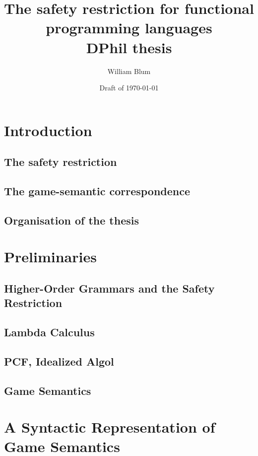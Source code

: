 


\author{William Blum}
\title{The safety restriction for functional programming languages\\{\small DPhil thesis}}
\date{Draft of \today}


\maketitle \tableofcontents


\chapter{Introduction}
    \section{The safety restriction}
    \section{The game-semantic correspondence}
    \section{Organisation of the thesis}

\chapter{Preliminaries}
    \section{Higher-Order Grammars and the Safety Restriction}
    \section{Lambda Calculus}
    \section{PCF, Idealized Algol}
    \section{Game Semantics}

\chapter{A Syntactic Representation of Game Semantics}
